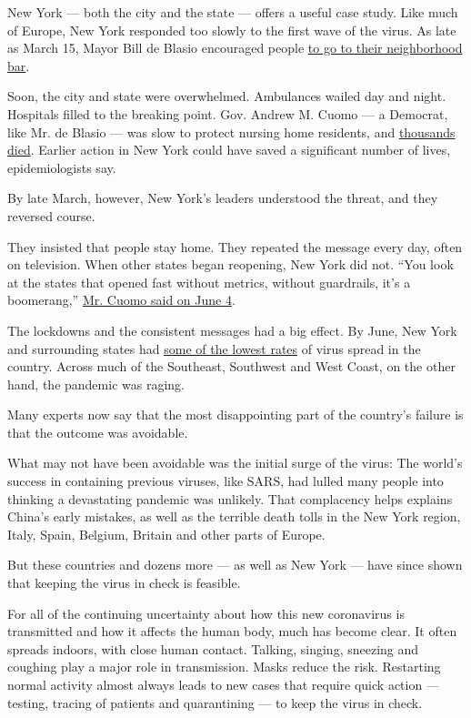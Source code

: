 New York --- both the city and the state --- offers a useful case study.
Like much of Europe, New York responded too slowly to the first wave of
the virus. As late as March 15, Mayor Bill de Blasio encouraged people
\href{https://nymag.com/intelligencer/2020/03/bill-de-blasio-had-his-worst-week-as-new-york-city-mayor.html}{to
go to their neighborhood bar}.

Soon, the city and state were overwhelmed. Ambulances wailed day and
night. Hospitals filled to the breaking point. Gov. Andrew M. Cuomo ---
a Democrat, like Mr. de Blasio --- was slow to protect nursing home
residents, and
\href{https://www.nytimes.com/2020/07/23/nyregion/nursing-homes-deaths-cuomo.html}{thousands
died}. Earlier action in New York could have saved a significant number
of lives, epidemiologists say.

By late March, however, New York's leaders understood the threat, and
they reversed course.

They insisted that people stay home. They repeated the message every
day, often on television. When other states began reopening, New York
did not. ``You look at the states that opened fast without metrics,
without guardrails, it's a boomerang,''
\href{https://www.governor.ny.gov/news/video-audio-photos-rush-transcript-governor-cuomo-announces-state-expanding-covid-19-testing}{Mr.
Cuomo said on June 4}.

The lockdowns and the consistent messages had a big effect. By June, New
York and surrounding states had
\href{https://www.nytimes.com/2020/07/22/us/coronavirus-northeast-governors.html}{some
of the lowest rates} of virus spread in the country. Across much of the
Southeast, Southwest and West Coast, on the other hand, the pandemic was
raging.

Many experts now say that the most disappointing part of the country's
failure is that the outcome was avoidable.

What may not have been avoidable was the initial surge of the virus: The
world's success in containing previous viruses, like SARS, had lulled
many people into thinking a devastating pandemic was unlikely. That
complacency helps explains China's early mistakes, as well as the
terrible death tolls in the New York region, Italy, Spain, Belgium,
Britain and other parts of Europe.

But these countries and dozens more --- as well as New York --- have
since shown that keeping the virus in check is feasible.

For all of the continuing uncertainty about how this new coronavirus is
transmitted and how it affects the human body, much has become clear. It
often spreads indoors, with close human contact. Talking, singing,
sneezing and coughing play a major role in transmission. Masks reduce
the risk. Restarting normal activity almost always leads to new cases
that require quick action --- testing, tracing of patients and
quarantining --- to keep the virus in check.

